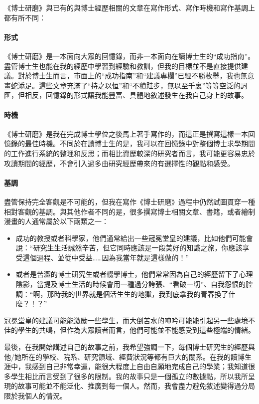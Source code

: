 \documentclass[12pt,UTF8,nofonts]{book}
\newcommand{\bookname}{博士研磨}
\begin{document}
《\bookname》與已有的與博士經歷相關的文章在寫作形式、寫作時機和寫作基調上都有所不同：

\paragraph{形式} 《\bookname》是一本面向大眾的回憶錄，而非一本面向在讀博士生的“成功指南”。盡管博士生也能在我的經歷中學習到經驗和教訓，但我的目標並不是直接提供建議。對於博士生而言，市面上的“成功指南”和“建議專欄”已經不勝枚舉，我也無意畫蛇添足。這些文章充滿了“持之以恒”和“不積跬步，無以至千裏”等等空泛的詞匯，但相反，回憶錄的形式讓我能豐富、具體地敘述發生在我自己身上的故事。

\paragraph{時機} 《\bookname》是我在完成博士學位之後馬上著手寫作的，而這正是撰寫這樣一本回憶錄的最佳時機。不同於在讀博士生的是，我可以在回憶錄中對整個博士求學期間的工作進行系統的整理和反思；而相比資歷較深的研究者而言，我可能更容易忠於攻讀期間的經歷，不會引入過多由研究經歷帶來的有選擇性的觀點和感受。


\paragraph{基調} 盡管保持完全客觀是不可能的，但我在寫作《\bookname》過程中仍然試圖貫穿一種相對客觀的基調。與其他作者不同的是，很多撰寫博士相關文章、書籍，或者繪制漫畫的人通常屬於以下兩類之一：
\begin{itemize}
\item 成功的教授或者科學家，他們通常給出一些冠冕堂皇的建議，比如他們可能會說：“研究生生活誠然辛苦，但它同時應該是一段美好的知識之旅，你應該享受這個過程、並從中受益……因為我當年就是這樣做的！”
\item 或者是苦澀的博士研究生或者輟學博士，他們常常因為自己的經歷留下了心理陰影，當提及博士生活的時候會用一種過分誇張、“看破一切”、自我怨恨的腔調：“啊，那時我的世界就是個活生生的地獄，我到底拿我的青春換了什麼？！？”
\end{itemize}

冠冕堂皇的建議可能能激勵一些學生，而大倒苦水的呻吟可能能引起另一些處境不佳的學生的共鳴，但作為大眾讀者而言，他們可能並不能感受到這些極端的情緒。

最後，在我開始講述自己的故事之前，我希望強調一下，每個博士研究生的經歷與他/她所在的學校、院系、研究領域、經費狀況等都有巨大的關系。在我的讀博生涯中，我感到自己非常幸運，能很大程度上自由自願地完成自己的學業；我知道很多學生相比而言受到了很多的限制。我的故事只是一個孤立的數據點，所以我所呈現的故事可能並不能泛化、推廣到每一個人。然而，我會盡力避免敘述變得過分局限於我個人的情況。
\end{document}
